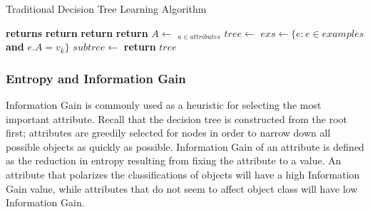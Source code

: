 \documentclass[12pt, letterpaper]{article}
\begin{document}
\begin{algorithm}
\begin{algorithmic}
\caption {Traditional Decision Tree Learning Algorithm} \label{Alg1} 
 \textbf{returns} 
    \State \textbf{return} 
  \EndIf
    \State \textbf{return} 
  \EndIf
    \State \textbf{return} 
  \EndIf
  \State $A \gets $ $_{a \in attributes}$ 
  \State $tree \gets $ 
    \State $exs \gets \{e : e \in examples $ \textbf{and} $e.A = v_{k}\}$
    \State $subtree \gets $
    \State {}
  \EndFor
  \State \textbf{return} $tree$
\EndFunction
\end{algorithmic}
\end{algorithm}


\subsubsection*{Entropy and Information Gain}

Information Gain is commonly used as a heuristic for selecting the most important
attribute.  Recall that the decision tree is constructed from the root first; 
attributes are greedily selected for nodes in order to narrow down all possible objects
as quickly as possible. Information Gain of an attribute is defined as the reduction in entropy
resulting from fixing the attribute to a value\cite{ML_Mitchell}.  An attribute that 
polarizes the classifications of objects will have a high Information Gain value,
while attributes that do not seem to affect object class will have low Information Gain.
\end{document}
